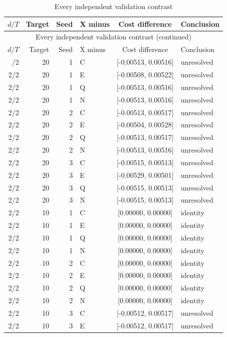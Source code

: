 \begingroup\small\setlength{\tabcolsep}{3pt}
\begin{longtable}{rrrlcl}
\caption{Every independent validation contrast}\label{tab:paired-registry57}\\
\hline
$d/T$ & Target & Seed & X minus & Cost difference & Conclusion \\
\hline
\endfirsthead
\multicolumn{6}{c}{Every independent validation contrast (continued)}\\
\hline
$d/T$ & Target & Seed & X minus & Cost difference & Conclusion \\
\hline
\endhead
\hline
\endfoot
2/2 & 20 & 1 & C & [-0.00513, 0.00516] & unresolved \\
2/2 & 20 & 1 & E & [-0.00508, 0.00522] & unresolved \\
2/2 & 20 & 1 & Q & [-0.00513, 0.00516] & unresolved \\
2/2 & 20 & 1 & N & [-0.00513, 0.00516] & unresolved \\
2/2 & 20 & 2 & C & [-0.00513, 0.00517] & unresolved \\
2/2 & 20 & 2 & E & [-0.00504, 0.00528] & unresolved \\
2/2 & 20 & 2 & Q & [-0.00513, 0.00517] & unresolved \\
2/2 & 20 & 2 & N & [-0.00513, 0.00516] & unresolved \\
2/2 & 20 & 3 & C & [-0.00515, 0.00513] & unresolved \\
2/2 & 20 & 3 & E & [-0.00529, 0.00501] & unresolved \\
2/2 & 20 & 3 & Q & [-0.00515, 0.00513] & unresolved \\
2/2 & 20 & 3 & N & [-0.00515, 0.00513] & unresolved \\
2/2 & 10 & 1 & C & [0.00000, 0.00000] & identity \\
2/2 & 10 & 1 & E & [0.00000, 0.00000] & identity \\
2/2 & 10 & 1 & Q & [0.00000, 0.00000] & identity \\
2/2 & 10 & 1 & N & [0.00000, 0.00000] & identity \\
2/2 & 10 & 2 & C & [0.00000, 0.00000] & identity \\
2/2 & 10 & 2 & E & [0.00000, 0.00000] & identity \\
2/2 & 10 & 2 & Q & [0.00000, 0.00000] & identity \\
2/2 & 10 & 2 & N & [0.00000, 0.00000] & identity \\
2/2 & 10 & 3 & C & [-0.00512, 0.00517] & unresolved \\
2/2 & 10 & 3 & E & [-0.00512, 0.00517] & unresolved \\

\end{longtable}
